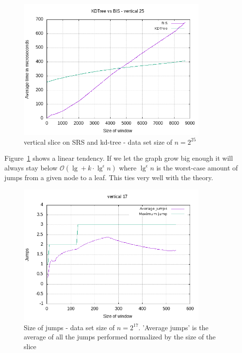 \begin{figure}[h]
    \centering
    \includegraphics[width = 0.85\textwidth]{pictures/analysis/vert_25.png}
    \caption{vertical slice on SRS and kd-tree - data set size of $n=2^{25}$}\label{fig:vert_25}
\end{figure}

\clearpage
Figure~\ref{fig:vert_25} shows a linear tendency. If we let the graph grow big enough it will always stay below $\mathcal{O}(\lg + k\cdot\lg^\epsilon n)$ where $\lg^\epsilon n$ is the worst-case amount of jumps from a given node to a leaf. This ties very well with the theory.


\begin{figure}[h]
    \centering
    \includegraphics[width = 0.85\textwidth]{pictures/analysis/jump_vert_17.png}
    \caption{Size of jumps - data set size of $n=2^{17}$. 'Average jumps' is the average of all the jumps performed normalized by the size of the slice}\label{fig:jump_vert_17}
\end{figure}


